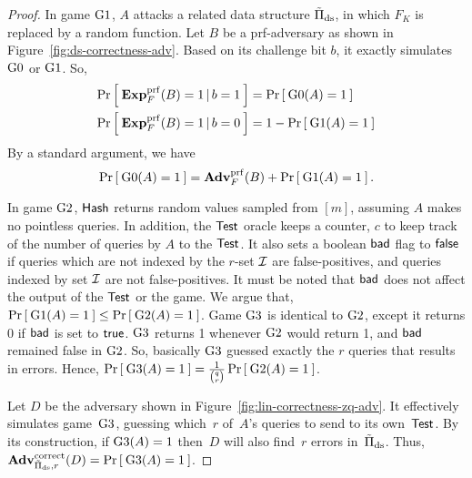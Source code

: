 \begin{proof}
In game $\text{G1}$, $A$ attacks a related data structure
$\tilde{\Pi}_\mathrm{ds}$, in which $F_K$ is replaced by a
random function. Let $B$ be a prf-adversary as shown in
Figure~\ref{fig:ds-correctness-adv}. Based on its challenge bit $b$,
it exactly simulates $\text{G0}$ or $\text{G1}$. So,
\begin{align*}
\Pr\left[\: \mathbf{Exp}^{\mathrm{prf}}_{F}(B) = 1\,|\,b=1 \:\right] &= \Pr\left[\: \text{G0}(A)=1 \:\right] \\
\Pr\left[\: \mathbf{Exp}^{\mathrm{prf}}_{F}(B) = 1\,|\,b=0 \:\right] &= 1-\Pr\left[\: \text{G1}(A)=1 \:\right]
\end{align*}
By a standard argument, we have
\begin{equation*}
\Prob{\game{0}(A)=1} = \AdvPRF{F}{B} + \Prob{\game{1}(A)=1}.%
\end{equation*}

In game $\text{G2}$, $\mathsf{Hash}$ returns random values sampled from
$[m]$, assuming $A$ makes no pointless queries. In addition, the
$\mathsf{Test}$ oracle keeps a counter, $c$ to keep track of the
number of queries by $A$ to the $\mathsf{Test}$. It also sets a
boolean $\mathsf{bad}$ flag to $\mathsf{false}$ if queries which are not indexed by
the $r$-set ${\cal I}$ are false-positives, and queries indexed by set
${\cal I}$ are not false-positives. It must be noted that $\mathsf{bad}$ does
not affect the output of the $\mathsf{Test}$ or the game. We argue
that, $\Pr\left[\: \text{G1}(A)=1 \:\right] \leq \Pr\left[\: \text{G2}(A)=1 \:\right]$. Game
$\text{G3}$ is identical to $\text{G2}$, except it returns 0 if $\mathsf{bad}$
is set to $\mathsf{true}$. $\text{G3}$ returns 1 whenever $\text{G2}$ would
return 1, and $\mathsf{bad}$ remained false in $\text{G2}$. So, basically
$\text{G3}$ guessed exactly the $r$ queries that results in errors.
Hence, $\Pr\left[\: \text{G3}(A)=1 \:\right] =
\frac{1}{\binom{q}{r}}\Pr\left[\: \text{G2}(A)=1 \:\right]$.

Let $D$ be the adversary shown in
Figure~\ref{fig:lin-correctness-zq-adv}. It effectively simulates
game~$\text{G3}$, guessing which~$r$ of~$A$'s queries to send to its
own~$\mathsf{Test}$. By its construction, if $\text{G3}(A)=1$ then~$D$
will also find~$r$ errors in~$\tilde{\Pi}_{\mathrm{ds}}$. Thus,
$\mathrm{\mathbf{Adv}}^{\mathrm{correct}}_{\tilde{\Pi}_{\mathrm{ds}},r}(D) =
\Pr\left[\: \text{G3}(A) = 1 \:\right]$.


\end{proof}
